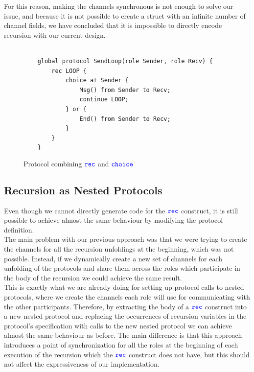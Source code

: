 \documentclass[12pt,twoside]{report}
\begin{document}
For this reason, making the channels synchronous is not enough to solve our issue, and because it is not possible to create a struct with an infinite number of channel fields, we have concluded that it is impossible to directly encode recursion with our current design. 

\begin{figure}[htb!]
    \centering
    \lstset{language=Scribble}
    \begin{lstlisting}
    
    global protocol SendLoop(role Sender, role Recv) {
        rec LOOP {
            choice at Sender {
                Msg() from Sender to Recv;
                continue LOOP;
            } or {
                End() from Sender to Recv;
            }
        }
    }
    \end{lstlisting}
    \caption{Protocol combining ${\color{blue}\mathtt{rec}}$ and ${\color{blue}\mathtt{choice}}$}
    \label{recursion-choice-protocol}
\end{figure}{}

\subsection{Recursion as Nested Protocols}
Even though we cannot directly generate code for the ${\color{blue}\mathtt{rec}}$ construct, it is still possible to achieve almost the same behaviour by modifying the protocol definition.\\

The main problem with our previous approach was that we were trying to create the channels for all the recursion unfoldings at the beginning, which was not possible. Instead, if we dynamically create a new set of channels for each unfolding of the protocols and share them across the roles which participate in the body of the recursion we could achieve the same result.\\

This is exactly what we are already doing for setting up protocol calls to nested protocols, where we create the channels each role will use for communicating with the other participants. Therefore, by extracting the body of a ${\color{blue}\mathtt{rec}}$ construct into a new nested protocol and replacing the occurrences of recursion variables in the protocol's specification with calls to the new nested protocol we can achieve almost the same behaviour as before. The main difference is that this approach introduces a point of synchronization for all the roles at the beginning of each execution of the recursion which the ${\color{blue}\mathtt{rec}}$ construct does not have, but this should not affect the expressiveness of our implementation.\\
\end{document}
